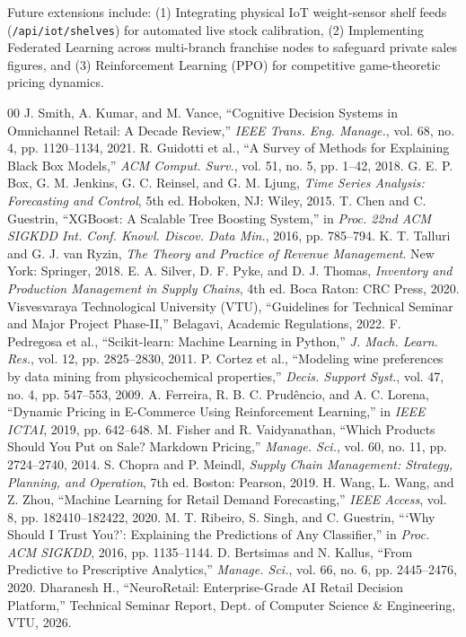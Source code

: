 \documentclass[conference]{IEEEtran}
\begin{document}
Future extensions include: (1) Integrating physical IoT weight-sensor shelf feeds (\texttt{/api/iot/shelves}) for automated live stock calibration, (2) Implementing Federated Learning across multi-branch franchise nodes to safeguard private sales figures, and (3) Reinforcement Learning (PPO) for competitive game-theoretic pricing dynamics.

\begin{thebibliography}{00}
 J. Smith, A. Kumar, and M. Vance, ``Cognitive Decision Systems in Omnichannel Retail: A Decade Review,'' \textit{IEEE Trans. Eng. Manage.}, vol. 68, no. 4, pp. 1120--1134, 2021.
 R. Guidotti et al., ``A Survey of Methods for Explaining Black Box Models,'' \textit{ACM Comput. Surv.}, vol. 51, no. 5, pp. 1--42, 2018.
 G. E. P. Box, G. M. Jenkins, G. C. Reinsel, and G. M. Ljung, \textit{Time Series Analysis: Forecasting and Control}, 5th ed. Hoboken, NJ: Wiley, 2015.
 T. Chen and C. Guestrin, ``XGBoost: A Scalable Tree Boosting System,'' in \textit{Proc. 22nd ACM SIGKDD Int. Conf. Knowl. Discov. Data Min.}, 2016, pp. 785--794.
 K. T. Talluri and G. J. van Ryzin, \textit{The Theory and Practice of Revenue Management}. New York: Springer, 2018.
 E. A. Silver, D. F. Pyke, and D. J. Thomas, \textit{Inventory and Production Management in Supply Chains}, 4th ed. Boca Raton: CRC Press, 2020.
 Visvesvaraya Technological University (VTU), ``Guidelines for Technical Seminar and Major Project Phase-II,'' Belagavi, Academic Regulations, 2022.
 F. Pedregosa et al., ``Scikit-learn: Machine Learning in Python,'' \textit{J. Mach. Learn. Res.}, vol. 12, pp. 2825--2830, 2011.
 P. Cortez et al., ``Modeling wine preferences by data mining from physicochemical properties,'' \textit{Decis. Support Syst.}, vol. 47, no. 4, pp. 547--553, 2009.
 A. Ferreira, R. B. C. Prud\^encio, and A. C. Lorena, ``Dynamic Pricing in E-Commerce Using Reinforcement Learning,'' in \textit{IEEE ICTAI}, 2019, pp. 642--648.
 M. Fisher and R. Vaidyanathan, ``Which Products Should You Put on Sale? Markdown Pricing,'' \textit{Manage. Sci.}, vol. 60, no. 11, pp. 2724--2740, 2014.
 S. Chopra and P. Meindl, \textit{Supply Chain Management: Strategy, Planning, and Operation}, 7th ed. Boston: Pearson, 2019.
 H. Wang, L. Wang, and Z. Zhou, ``Machine Learning for Retail Demand Forecasting,'' \textit{IEEE Access}, vol. 8, pp. 182410--182422, 2020.
 M. T. Ribeiro, S. Singh, and C. Guestrin, ```Why Should I Trust You?': Explaining the Predictions of Any Classifier,'' in \textit{Proc. ACM SIGKDD}, 2016, pp. 1135--1144.
 D. Bertsimas and N. Kallus, ``From Predictive to Prescriptive Analytics,'' \textit{Manage. Sci.}, vol. 66, no. 6, pp. 2445--2476, 2020.
 Dharanesh H., ``NeuroRetail: Enterprise-Grade AI Retail Decision Platform,'' Technical Seminar Report, Dept. of Computer Science \& Engineering, VTU, 2026.
\end{thebibliography}
\end{document}
